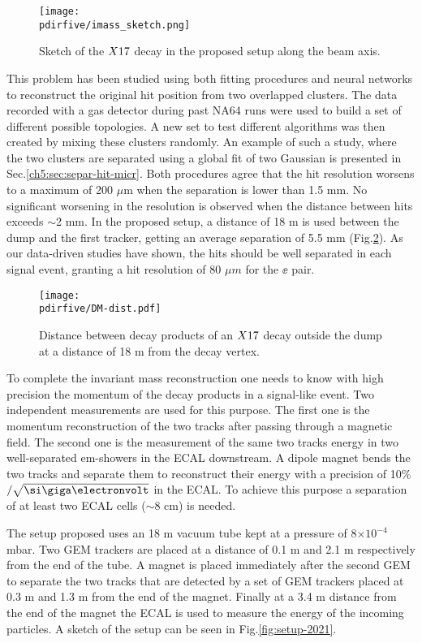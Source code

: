 \begin{figure}[bth!]
  \centering
  \texttt{[image: \\pdirfive/imass\_sketch.png]}
  \caption[Invariant mass reconstruction sketch]{Sketch of the $X17$ decay in the proposed setup along the beam axis.}
  \label{fig:imass_sketch}
\end{figure}


This problem has been studied using both fitting procedures and neural networks to reconstruct the original hit position from two overlapped clusters. The data recorded with a gas detector during past NA64 runs were used to build a set of different possible topologies. A new set to test different algorithms was then created by mixing these clusters randomly. An example of such a study, where the two clusters are separated using a global fit of two Gaussian is presented in Sec.\ref{ch5:sec:separ-hit-micr}. Both procedures agree that the hit resolution worsens to a maximum of 200 $\mu$m when the separation is lower than 1.5 mm. No significant worsening in the resolution is observed when the distance between hits exceeds $\sim$2 mm. In the proposed setup, a distance of 18 m is used between the dump and the first tracker, getting an average separation of 5.5 mm (Fig.\ref{fig:dm_dist1}). As our data-driven studies have shown, the hits should be well separated in each signal event, granting a hit resolution of 80 $\mu m$ for the $\ee$ pair.

\begin{figure}[tbh!]
  \centering
  \texttt{[image: \\pdirfive/DM-dist.pdf]}
  \caption[Distance of the decay products of X17 in the 2021 setup]{Distance between decay products of an $X17$ decay outside the dump at a distance of 18 m from the decay vertex.}
  \label{fig:dm_dist1}
\end{figure}

To complete the invariant mass reconstruction one needs to know with high precision the momentum of the decay products in a signal-like event. Two independent measurements are used for this purpose. The first one is the momentum reconstruction of the two tracks after passing through a magnetic field. The second one is the measurement of the same two tracks energy in two well-separated em-showers in the ECAL downstream. A dipole magnet bends the two tracks and separate them to reconstruct their energy with a precision of 10\%$/\sqrt{\gev}$ in the ECAL. To achieve this purpose a separation of at least two ECAL cells ($\sim 8$ cm) is needed.

The setup proposed uses an 18 m vacuum tube kept at a pressure of 8$\times 10^{-4}$ mbar. Two GEM trackers \cite{gem} are placed at a distance of 0.1 m and 2.1 m respectively from the end of the tube. A magnet is placed immediately after the second GEM to separate the two tracks that are detected by a set of GEM trackers placed at 0.3 m and 1.3 m from the end of the magnet. Finally at a 3.4 m distance from the end of the magnet the ECAL is used to measure the energy of the incoming particles. A sketch of the setup can be seen in Fig.\ref{fig:setup-2021}.

